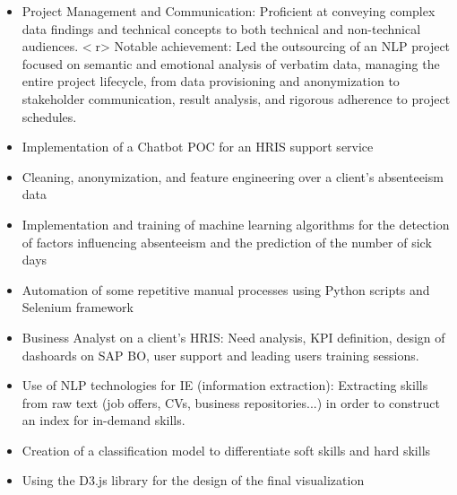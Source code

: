 \documentclass[10pt,letter,ragged2e,withhyper]{altacv}
\renewcommand{\divider}{\vspace{-0.2cm}\textcolor{body!30}{\hdashrule{\linewidth}{0.6pt}{0.5ex}}\smallskip\vspace{-0.1cm}} %
\begin{document}
\begin{paracol}{2}
\begin{itemize}
  \item Project Management and Communication: Proficient at conveying complex data findings and technical concepts to both technical and non-technical audiences. \textless{}r\textgreater{} Notable achievement: Led the outsourcing of an NLP project focused on semantic and emotional analysis of verbatim data, managing the entire project lifecycle, from data provisioning and anonymization to stakeholder communication, result analysis, and rigorous adherence to project schedules.
\end{itemize}

\divider\smallskip
{}

\begin{itemize}
\end{itemize}

\divider\smallskip
{}

\begin{itemize}
  \item Implementation of a Chatbot POC for an HRIS support service
  \item Cleaning, anonymization, and feature engineering over a client's absenteeism data
  \item Implementation and training of machine learning algorithms for the detection of factors influencing absenteeism and the prediction of the number of sick days
  \item Automation of some repetitive manual processes using Python scripts and Selenium framework
  \item Business Analyst on a client's HRIS: Need analysis, KPI definition, design of dashoards on SAP BO, user support and leading users training sessions.
  \item Use of NLP technologies for IE (information extraction): Extracting skills from raw text (job offers, CVs, business repositories...) in order to construct an index for in-demand skills.
  \item Creation of a classification model to differentiate soft skills and hard skills
  \item Using the D3.js library for the design of the final visualization
\end{itemize}

\divider\smallskip
{}


\end{paracol}
\end{document}
